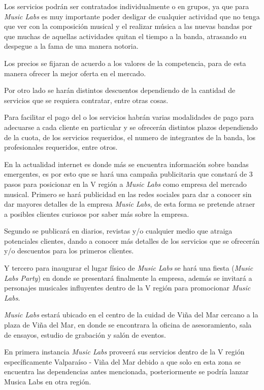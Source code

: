 Los servicios podrán ser contratados individualmente o en grupos,
ya que para \emph{Music Labs} es muy importante poder desligar de cualquier actividad que no tenga
que ver con la composición musical y el realizar música a las nuevas bandas por que muchas
de aquellas actividades quitan el tiempo a la banda, atrasando su despegue a la fama de una
manera notoria.

Los precios se fijaran de acuerdo a los valores de la competencia,
para de esta manera ofrecer la mejor oferta en el mercado.

Por otro lado se harán distintos descuentos dependiendo de la cantidad de servicios que se requiera contratar,
entre otras cosas.

Para facilitar el pago del o los servicios habrán varias modalidades de pago para adecuarse
a cada cliente en particular y se ofrecerán distintos plazos dependiendo de la cuota,
de los servicios requeridos, el numero de integrantes de la banda, los profesionales requeridos, entre otros.

En la actualidad internet es donde más se encuentra información sobre bandas emergentes,
es por esto que se hará una campaña publicitaria que constará de 3 pasos para posicionar
en la V región a \emph{Music Labs} como empresa del mercado musical. Primero se hará publicidad en las redes
sociales  para dar a conocer sin dar mayores detalles de la empresa \emph{Music Labs},
de esta forma se pretende atraer a posibles clientes curiosos por saber más sobre la empresa.

Segundo se publicará en diarios, revistas y/o cualquier medio que atraiga potenciales clientes,
dando a conocer más detalles de los servicios que se ofrecerán y/o descuentos para los primeros clientes.

Y tercero para inaugurar el lugar físico de \emph{Music Labs} se hará una fiesta (\emph{Music Labs Party})
en donde se presentará finalmente la empresa, además se invitará a personajes musicales influyentes
dentro de la V región para promocionar \emph{Music Labs}.

\emph{Music Labs} estará ubicado en el centro de la cuidad de Viña del Mar cercano a la plaza de Viña del Mar,
en donde se encontrara la oficina de asesoramiento, sala de ensayos, estudio de grabación y salón de eventos.

En primera instancia \emph{Music Labs} proveerá sus servicios dentro de la V región específicamente Valparaíso - Viña del Mar
debido a que solo en esta zona se encuentra las dependencias antes mencionada,
posteriormente se podría lanzar Musica Labs en otra región.

